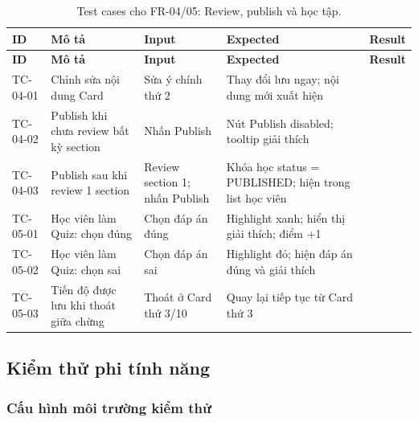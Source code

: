 \begin{longtable}{|p{1.5cm}|p{4.5cm}|p{3.5cm}|p{3cm}|p{2cm}|}
    \caption{Test cases cho FR-04/05: Review, publish và học tập.} \label{tab:tc-fr04} \\
    \hline
    \textbf{ID} & \textbf{Mô tả} & \textbf{Input} & \textbf{Expected} & \textbf{Result} \\
    \hline
    \endfirsthead \hline
    \textbf{ID} & \textbf{Mô tả} & \textbf{Input} & \textbf{Expected} & \textbf{Result} \\
    \hline \endhead

    TC-04-01 & Chỉnh sửa nội dung Card &
        Sửa ý chính thứ 2 &
        Thay đổi lưu ngay; nội dung mới xuất hiện & \\ \hline

    TC-04-02 & Publish khi chưa review bất kỳ section &
        Nhấn Publish &
        Nút Publish disabled; tooltip giải thích & \\ \hline

    TC-04-03 & Publish sau khi review 1 section &
        Review section 1; nhấn Publish &
        Khóa học status = PUBLISHED; hiện trong list học viên & \\ \hline

    TC-05-01 & Học viên làm Quiz: chọn đúng &
        Chọn đáp án đúng &
        Highlight xanh; hiển thị giải thích; điểm +1 & \\ \hline

    TC-05-02 & Học viên làm Quiz: chọn sai &
        Chọn đáp án sai &
        Highlight đỏ; hiện đáp án đúng và giải thích & \\ \hline

    TC-05-03 & Tiến độ được lưu khi thoát giữa chừng &
        Thoát ở Card thứ 3/10 &
        Quay lại tiếp tục từ Card thứ 3 & \\ \hline
\end{longtable}

\subsection{Kiểm thử phi tính năng}

\subsubsection{Cấu hình môi trường kiểm thử}

